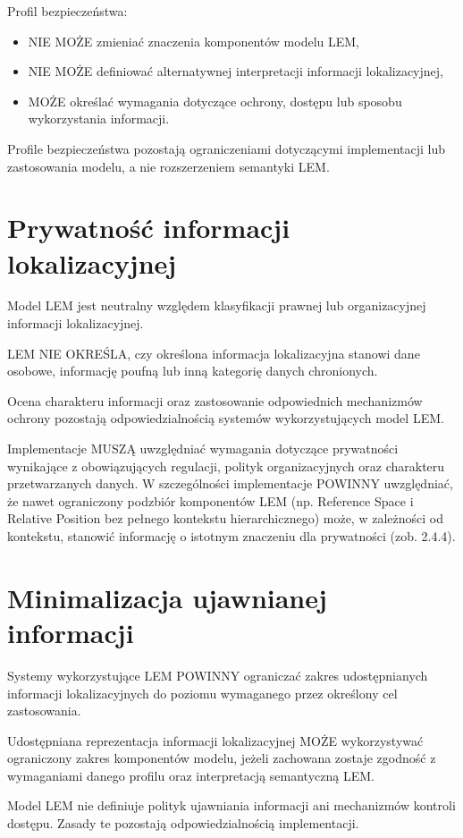 Profil bezpieczeństwa:
\begin{itemize}
    \item NIE MOŻE zmieniać znaczenia komponentów modelu LEM,
    \item NIE MOŻE definiować alternatywnej interpretacji informacji lokalizacyjnej,
    \item MOŻE określać wymagania dotyczące ochrony, dostępu lub sposobu wykorzystania informacji.
\end{itemize}

Profile bezpieczeństwa pozostają ograniczeniami dotyczącymi implementacji lub zastosowania modelu, a nie rozszerzeniem semantyki LEM.

\section{Prywatność informacji lokalizacyjnej}
Model LEM jest neutralny względem klasyfikacji prawnej lub organizacyjnej informacji lokalizacyjnej.

LEM NIE OKREŚLA, czy określona informacja lokalizacyjna stanowi dane osobowe, informację poufną lub inną kategorię danych chronionych.

Ocena charakteru informacji oraz zastosowanie odpowiednich mechanizmów ochrony pozostają odpowiedzialnością systemów wykorzystujących model LEM.

Implementacje MUSZĄ uwzględniać wymagania dotyczące prywatności wynikające z obowiązujących regulacji, polityk organizacyjnych oraz charakteru przetwarzanych danych. W szczególności implementacje POWINNY uwzględniać, że nawet ograniczony podzbiór komponentów LEM (np. Reference Space i Relative Position bez pełnego kontekstu hierarchicznego) może, w zależności od kontekstu, stanowić informację o istotnym znaczeniu dla prywatności (zob. 2.4.4).

\section{Minimalizacja ujawnianej informacji}
Systemy wykorzystujące LEM POWINNY ograniczać zakres udostępnianych informacji lokalizacyjnych do poziomu wymaganego przez określony cel zastosowania.

Udostępniana reprezentacja informacji lokalizacyjnej MOŻE wykorzystywać ograniczony zakres komponentów modelu, jeżeli zachowana zostaje zgodność z wymaganiami danego profilu oraz interpretacją semantyczną LEM.

Model LEM nie definiuje polityk ujawniania informacji ani mechanizmów kontroli dostępu. Zasady te pozostają odpowiedzialnością implementacji.

